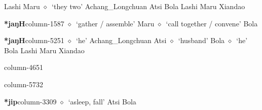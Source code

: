          Lashi 
\hspace{1ex}
         Maru 
\hspace{1ex}
         $\diamond$~`they two'
         Achang\_Longchuan 
\hspace{1ex}
         Atsi 
\hspace{1ex}
         Bola 
\hspace{1ex}
         Lashi 
\hspace{1ex}
         Maru 
\hspace{1ex}
         Xiandao 
  \item {\footnotesize \textbf{*jaŋH}}{\tiny column-1587}
         $\diamond$~`gather / assemble'
         Maru 
\hspace{1ex}
         $\diamond$~`call together / convene'
         Bola 
  \item {\footnotesize \textbf{*jaŋH}}{\tiny column-5251}
         $\diamond$~`he'
         Achang\_Longchuan 
\hspace{1ex}
         Atsi 
\hspace{1ex}
         $\diamond$~`husband'
         Bola 
\hspace{1ex}
         $\diamond$~`he'
         Bola 
\hspace{1ex}
         Lashi 
\hspace{1ex}
         Maru 
\hspace{1ex}
         Xiandao 
  \item {\footnotesize \textbf{}}{\tiny column-4651}
  \item {\footnotesize \textbf{}}{\tiny column-5732}
  \item {\footnotesize \textbf{*jip}}{\tiny column-3309}
         $\diamond$~`asleep, fall'
         Atsi 
\hspace{1ex}
         Bola 
